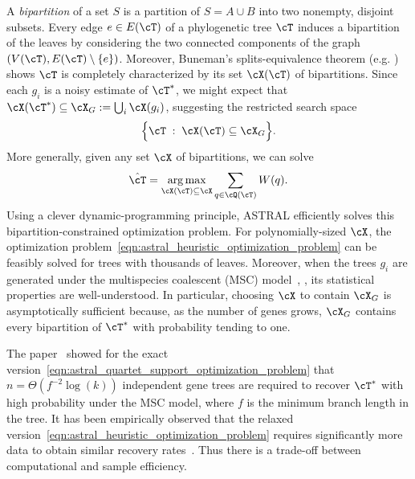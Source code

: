 A \textit{bipartition} of a set $S$ is a partition of $S = A \cup B$ into two nonempty, disjoint subsets.
Every edge $e \in E(\cT)$ of a phylogenetic tree $\cT$ induces a bipartition of the leaves by considering the two connected components
of the graph $(V(\cT), E(\cT) \setminus \{e\})$. Moreover, Buneman's splits-equivalence theorem (e.g. \cite[Theorem~3.1.4]{semple2003_phylogenetics}) shows $\cT$
is completely characterized by its set $\cX(\cT)$ of bipartitions. Since each $g_i$ is a noisy estimate of $\cT^*$, we
might expect that $\cX(\cT^*) \subseteq \cX_G := \bigcup_i \cX(g_i)$, suggesting
the restricted search space
%
\[\Big\{\cT \; : \; \cX(\cT) \subseteq \cX_G\Big\}.\]
%
\noindent More generally, given any set $\cX$ of bipartitions, we can solve
%
%
\begin{equation}
    \hat{\cT} = \argmax_{\cX(\cT) \subseteq \cX}  \sum_{q \in \cQ(\cT)} W(q).
    \label{eqn:astral_heuristic_optimization_problem}
\end{equation}
%
%
Using a clever dynamic-programming principle, ASTRAL efficiently solves this bipartition-constrained
optimization problem. For polynomially-sized $\cX$, the optimization problem~\eqref{eqn:astral_heuristic_optimization_problem}
can be feasibly solved for trees with thousands of leaves. Moreover, when the trees $g_i$ are generated under the
multispecies coalescent (MSC) model~\cite{rannala2020_multispecies_coalescent_species_tree_inference}, \cite{hill2020_species_tree_joint_coalescence_duplication}, its statistical properties
are well-understood. In particular, choosing $\cX$ to contain $\cX_G$ is asymptotically sufficient because,
as the number of genes grows, $\cX_G$ contains every bipartition of $\cT^*$ with probability tending to one.

The paper~\cite{shekhar2018_how_many_genes_are_enough} showed for the exact version~\eqref{eqn:astral_quartet_support_optimization_problem}
that $n = \Theta(f^{-2} \log(k))$ independent gene trees are required to recover $\cT^*$ with high probability under the MSC model, where $f$ is the minimum
branch length in the tree. It has been empirically observed that the relaxed version~\eqref{eqn:astral_heuristic_optimization_problem} requires
significantly more data to obtain similar recovery rates~\cite{shekhar2018_how_many_genes_are_enough}. Thus there is a trade-off
between computational and sample efficiency.

